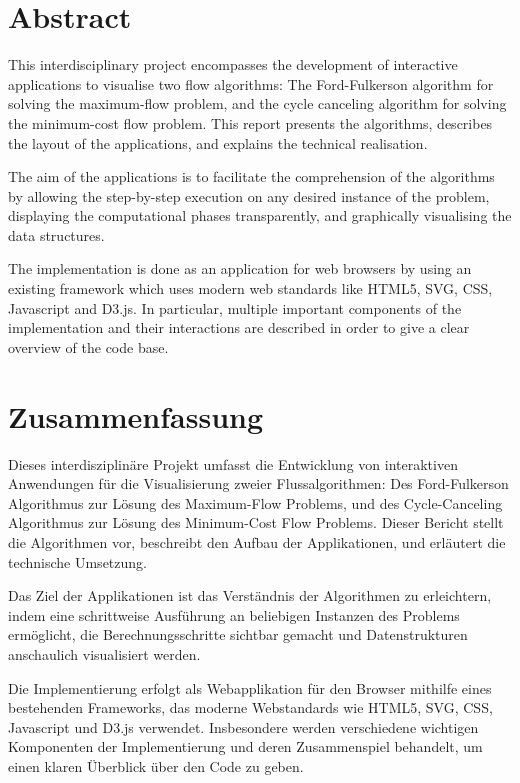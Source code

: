 
\cleardoublepage
{}
\section*{Abstract}

This interdisciplinary project encompasses the development of interactive applications to visualise two flow algorithms: The Ford-Fulkerson algorithm for solving the maximum-flow problem, and the cycle canceling algorithm for solving the minimum-cost flow problem. This report presents the algorithms, describes the layout of the applications, and explains the technical realisation.

The aim of the applications is to facilitate the comprehension of the algorithms by allowing the step-by-step execution on any desired instance of the problem, displaying the computational phases transparently, and graphically visualising the data structures.

The implementation is done as an application for web browsers by using an existing framework which uses modern web standards like HTML5, SVG, CSS, Javascript and D3.js. In particular, multiple important components of the implementation and their interactions are described in order to give a clear overview of the code base. 


\section*{Zusammenfassung}

Dieses interdisziplinäre Projekt umfasst die Entwicklung von interaktiven Anwendungen für die Visualisierung zweier Flussalgorithmen: Des Ford-Fulkerson Algorithmus zur Lösung des Maximum-Flow Problems, und des Cycle-Canceling Algorithmus zur Lösung des Minimum-Cost Flow Problems. Dieser Bericht stellt die Algorithmen vor, beschreibt den Aufbau der Applikationen, und erläutert die technische Umsetzung. 

Das Ziel der Applikationen ist das Verständnis der Algorithmen zu erleichtern, indem eine schrittweise Ausführung an beliebigen Instanzen des Problems ermöglicht, die Berechnungsschritte sichtbar gemacht und Datenstrukturen anschaulich visualisiert werden.

Die Implementierung erfolgt als Webapplikation für den Browser mithilfe eines bestehenden Frameworks, das moderne Webstandards wie HTML5, SVG, CSS, Javascript und D3.js verwendet. Insbesondere werden verschiedene wichtigen Komponenten der Implementierung und deren Zusammenspiel behandelt, um einen klaren Überblick über den Code zu geben.


